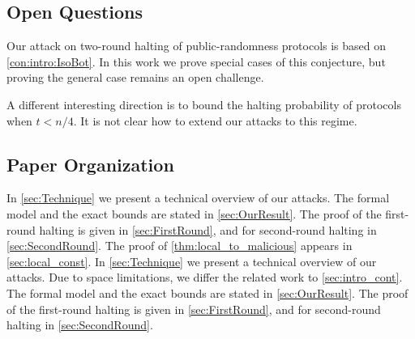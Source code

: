 \ifdefined\IsFullVersion


\subsection{Open Questions}\label{sec:OpenQuest}
Our attack on two-round halting of public-randomness protocols is based on \cref{con:intro:IsoBot}. In this work we prove special cases of this conjecture, but proving the general case remains an open challenge.

A different interesting direction is to bound the halting probability of protocols when $t<n/4$. It is not clear how to extend our attacks to this regime.
\fi

\subsection*{Paper Organization}

\ifdefined\IsFullVersion
In \cref{sec:Technique} we present a technical overview of our attacks. The formal model and the exact bounds are stated in \cref{sec:OurResult}. The proof of the first-round halting is given in \cref{sec:FirstRound}, and for second-round halting in \cref{sec:SecondRound}.
\ifdefined\IsAppendix
The proof of \cref{thm:local_to_malicious} appears in \cref{sec:local_const}.
\fi
\else
In \cref{sec:Technique} we present a technical overview of our attacks. Due to space limitations, we differ the related work to \cref{sec:intro_cont}. The formal model and the exact bounds are stated in \cref{sec:OurResult}. The proof of the first-round halting is given in \cref{sec:FirstRound}, and for second-round halting in \cref{sec:SecondRound}.
\fi

